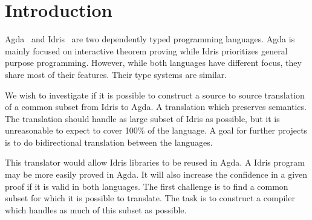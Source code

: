 \documentclass[parskip=half]{scrartcl}
\begin{document}

%
%
%



\section{Introduction}

Agda~\cite{agda} and Idris~\cite{idris} are two dependently typed programming
languages.  Agda is mainly focused on interactive theorem proving while Idris
prioritizes general purpose programming.  However, while both languages have
different focus, they share most of their features. Their type systems are
similar.



We wish to investigate if it is possible to construct a source to source
translation of a common subset from Idris to Agda. A translation which
preserves semantics. The translation should handle as large subset of Idris as
possible, but it is unreasonable to expect to cover 100\% of the language.
A goal for further projects is to do bidirectional translation between the
languages.

This translator would allow Idris libraries to be reused in Agda. A Idris
program may be more easily proved in Agda.  It will also increase the
confidence in a given proof if it is valid in both languages.  The first
challenge is to find a common subset for which it is possible to translate. The
task is to construct a compiler which handles as much of this subset as
possible.
\end{document}
